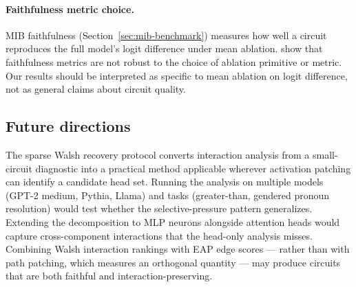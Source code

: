 \paragraph{Faithfulness metric choice.}

MIB faithfulness (Section~\ref{sec:mib-benchmark}) measures how well a
circuit reproduces the full model's logit difference under mean ablation.
\citet{chughtai2024faithfulness} show that faithfulness metrics are not
robust to the choice of ablation primitive or metric. Our results should
be interpreted as specific to mean ablation on logit difference, not as
general claims about circuit quality.

\subsection{Future directions}

The sparse Walsh recovery protocol converts interaction analysis from a
small-circuit diagnostic into a practical method applicable wherever
activation patching can identify a candidate head set. Running the
analysis on multiple models (GPT-2 medium, Pythia, Llama) and tasks
(greater-than, gendered pronoun resolution) would test whether the
selective-pressure pattern generalizes. Extending the decomposition to
MLP neurons alongside attention heads would capture cross-component
interactions that the head-only analysis misses. Combining Walsh
interaction rankings with EAP edge scores --- rather than with path
patching, which measures an orthogonal quantity --- may produce circuits
that are both faithful and interaction-preserving.
